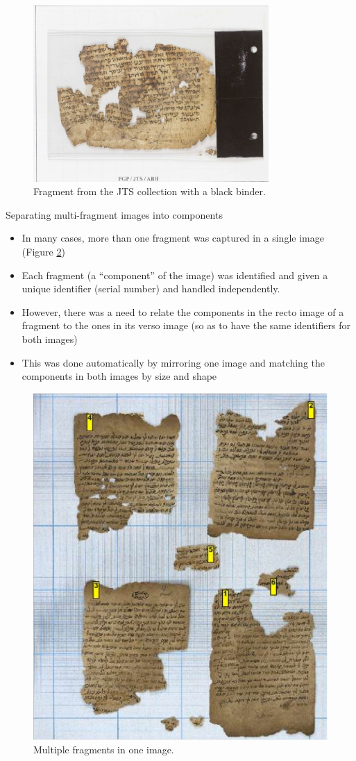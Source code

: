 \documentclass[12pt]{beamer}
\begin{document}
\begin{frame}
\begin{figure}
\includegraphics[width=0.8\textwidth]{images/2.JPG}
\caption{Fragment from the JTS collection with a black binder.}\label{fig:binder}
\end{figure}
\end{frame}

\begin{frame}{Separating multi-fragment images into components}
\begin{itemize}
\item In many cases, more than one fragment was captured in a single image (Figure \ref{fig:multifragment})
\item Each fragment (a “component” of the image) was identified and given a unique identifier (serial number) and handled independently.
\item However, there was a need to relate the components in the recto image of a fragment to the ones in its verso image (so as to have the same identifiers for both images)
\item This was done automatically by mirroring one image and matching the components in both images by size and shape
\end{itemize}
\end{frame}

\begin{frame}
\begin{figure}
\includegraphics[height=0.6\textwidth]{images/3.JPG}
\caption{Multiple fragments in one image.}\label{fig:multifragment}
\end{figure}
\end{frame}
\end{document}
